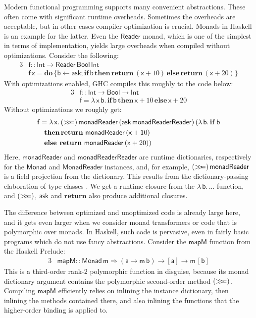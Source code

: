 \documentclass[acmsmall,screen]{acmart}
\newcommand{\msf}[1]{{\mathsf{#1}}}
\newcommand{\mbf}[1]{{\mathbf{#1}}}
\newcommand{\mdo}{\mbf{do}\,}
\newcommand{\ind}{\hspace{1em}}
\newcommand{\bif}{\mbf{if}\,}
\newcommand{\bthen}{\mbf{then}\,}
\newcommand{\belse}{\mbf{else}\,}
\newcommand{\return}{\mbf{return}\,}
\newcommand{\lam}{\lambda\,}
\newcommand{\vm}{\mathsf{m}}
\newcommand{\va}{\mathsf{a}}
\newcommand{\vb}{\mathsf{b}}
\newcommand{\vx}{\mathsf{x}}
\newcommand{\vf}{\mathsf{f}}
\newcommand{\Int}{\msf{Int}}
\newcommand{\Reader}{\msf{Reader}}
\newcommand{\Monad}{\msf{Monad}}
\newcommand{\Bool}{\msf{Bool}}
\newcommand{\fro}{\leftarrow}
\newcommand{\bind}{\mathbin{>\!\!>\mkern-6.7mu=}}
\theoremstyle{remark}
\begin{document}
Modern functional programming supports many convenient abstractions. These often
come with significant runtime overheads. Sometimes the overheads are acceptable,
but in other cases compiler optimization is crucial. Monads in Haskell is an
example for the latter. Even the $\Reader$ monad, which is one of the simplest
in terms of implementation, yields large overheads when compiled without
optimizations. Consider the following:
\begin{alignat*}{3}
  &\vf :: \Int \to \Reader\,\Bool\,\Int \\
  &\vf\,\vx = \mdo\{\vb \fro \msf{ask}; \bif \vb\, \bthen \return (\vx + 10)\, \belse \return (\vx + 20)\}
\end{alignat*}
With optimizations enabled, GHC compiles this roughly to the code below:
\begin{alignat*}{3}
  &\vf :: \Int \to \Bool \to \Int \\
  &\vf = \lam \vx\,\vb.\, \bif \vb\, \bthen \vx + 10\, \belse \vx + 20
\end{alignat*}
Without optimizations we roughly get:
\begin{alignat*}{3}
  &\vf = \lam \vx.\,(\bind)\,\msf{monadReader}\,(\msf{ask}\,\msf{monadReaderReader})\,(\lam \vb.\,\bif \vb\\
  &\ind \bthen\return\,\msf{monadReader}\,(\vx + 10)\\
  &\ind \belse\hspace{0.25em}\return\,\msf{monadReader}\,(\vx + 20))
\end{alignat*}
Here, $\msf{monadReader}$ and $\msf{monadReaderReader}$ are runtime
dictionaries, respectively for the $\msf{Monad}$ and $\msf{MonadReader}$
instances, and, for example, $(\bind)\,\msf{monadReader}$ is a field projection
from the dictionary. This results from the dictionary-passing elaboration of
type classes \cite{DBLP:conf/popl/WadlerB89}. We get a runtime closure from the
$\lam \vb.\,...$ function, and $(\bind)$, $\msf{ask}$ and $\mbf{return}$ also
produce additional closures.

The difference between optimized and unoptimized code is already large here, and
it gets even larger when we consider monad transformers or code that is
polymorphic over monads. In Haskell, such code is pervasive, even in fairly
basic programs which do not use fancy abstractions. Consider the $\msf{mapM}$
function from the Haskell Prelude:
\begin{alignat*}{3}
  & \msf{mapM} :: \Monad\,\vm \Rightarrow (\va \to \vm\,\vb) \to [\va] \to \vm\,[\vb]
\end{alignat*}
This is a third-order rank-2 polymorphic function in disguise, because
its monad dictionary argument contains the polymorphic second-order method
$(\bind)$.  Compiling $\msf{mapM}$ efficiently relies on inlining the instance
dictionary, then inlining the methods contained there, and also inlining the
functions that the higher-order binding is applied to.
\end{document}
